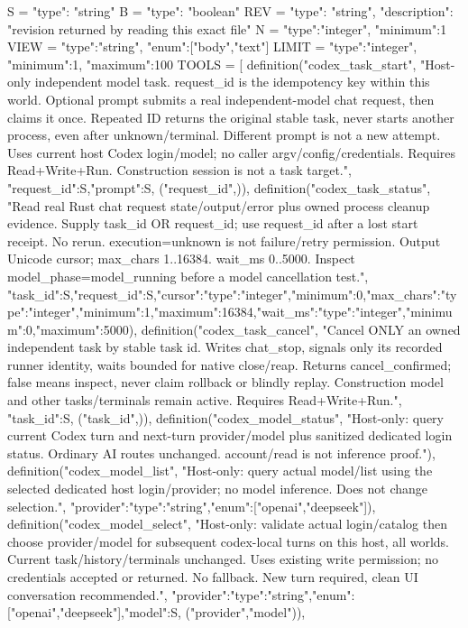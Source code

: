 S = {"type": "string"}
B = {"type": "boolean"}
REV = {"type": "string", "description": "revision returned by reading this exact file"}
N = {"type":"integer", "minimum":1}
VIEW = {"type":"string", "enum":["body","text"]}
LIMIT = {"type":"integer", "minimum":1, "maximum":100}
TOOLS = [
    definition("codex_task_start", "Host-only independent model task. request_id is the idempotency key within this world. Optional prompt submits a real independent-model chat request, then claims it once. Repeated ID returns the original stable task, never starts another process, even after unknown/terminal. Different prompt is not a new attempt. Uses current host Codex login/model; no caller argv/config/credentials. Requires Read+Write+Run. Construction session is not a task target.", {"request_id":S,"prompt":S}, ("request_id",)),
    definition("codex_task_status", "Read real Rust chat request state/output/error plus owned process cleanup evidence. Supply task_id OR request_id; use request_id after a lost start receipt. No rerun. execution=unknown is not failure/retry permission. Output Unicode cursor; max_chars 1..16384. wait_ms 0..5000. Inspect model_phase=model_running before a model cancellation test.", {"task_id":S,"request_id":S,"cursor":{"type":"integer","minimum":0},"max_chars":{"type":"integer","minimum":1,"maximum":16384},"wait_ms":{"type":"integer","minimum":0,"maximum":5000}}),
    definition("codex_task_cancel", "Cancel ONLY an owned independent task by stable task id. Writes chat_stop, signals only its recorded runner identity, waits bounded for native close/reap. Returns cancel_confirmed; false means inspect, never claim rollback or blindly replay. Construction model and other tasks/terminals remain active. Requires Read+Write+Run.", {"task_id":S}, ("task_id",)),
    definition("codex_model_status", "Host-only: query current Codex turn and next-turn provider/model plus sanitized dedicated login status. Ordinary AI routes unchanged. account/read is not inference proof."),
    definition("codex_model_list", "Host-only: query actual model/list using the selected dedicated host login/provider; no model inference. Does not change selection.", {"provider":{"type":"string","enum":["openai","deepseek"]}}),
    definition("codex_model_select", "Host-only: validate actual login/catalog then choose provider/model for subsequent codex-local turns on this host, all worlds. Current task/history/terminals unchanged. Uses existing write permission; no credentials accepted or returned. No fallback. New turn required, clean UI conversation recommended.", {"provider":{"type":"string","enum":["openai","deepseek"]},"model":S}, ("provider","model")),
